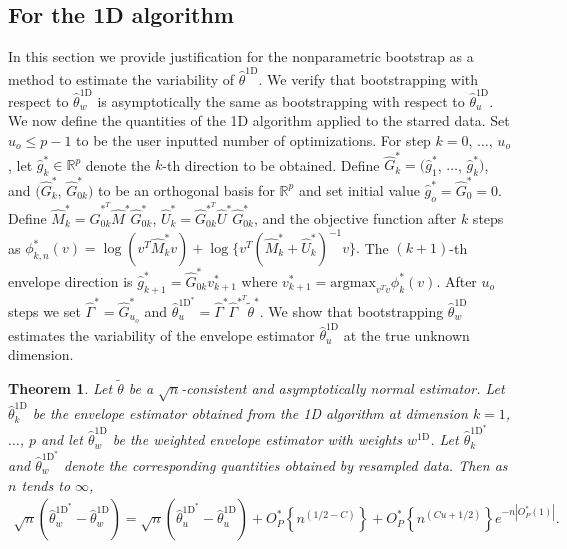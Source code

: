 \documentclass{article}\usepackage[]{graphicx}\usepackage[]{color}
\newcommand{\R}{\mathbb{R}}
\newcommand{\Mstar}{\widehat{M}^{\textstyle{*}}}
\newcommand{\Ustar}{\widehat{U}^{\textstyle{*}}}
\newcommand{\TFG}{\widehat{\theta}^{\text{FG}}}
\newcommand{\TD}{\widehat{\theta}^{\text{1D}}}
\newcommand{\Ttil}{\widetilde{\theta}}
\newcommand{\TstarFG}{\widehat{\theta}^{{\text{FG}}^{\textstyle{*}}}}
\newcommand{\TstarD}{\widehat{\theta}^{{\text{1D}}^{\textstyle{*}}}}
\newcommand{\Ttilstar}{\widetilde{\theta}^{\textstyle{*}}}
\newcommand{\Gamstar}{\widehat{\Gamma}^{\textstyle{*}}}
\newcommand{\GamstarT}{\widehat{\Gamma}^{\textstyle{*}^T}}
\newcommand{\rootn}{\sqrt{n}}
\newcommand{\phistar}{\phi^{\textstyle{*}}}
\newcommand{\woneD}{w^{\text{1D}}}
\newcommand{\gstar}{\hat{g}^{\textstyle{*}}}
\newcommand{\Gstar}{\widehat{G}^{\textstyle{*}}}
\newcommand{\GstarT}{\widehat{G}^{\textstyle{*}^T}}
\newcommand{\vstar}{v^{\textstyle{*}}}
\newtheorem{thm}{Theorem}
\begin{document}
\subsection{For the 1D algorithm}
\label{sec:boot1D}

In this section we provide justification for the nonparametric bootstrap as a method to estimate the variability of $\TD$. %
We verify that bootstrapping with respect to $\TD_w$ is asymptotically the same as bootstrapping with respect to $\TD_u$. We now define the quantities of the 1D algorithm applied to the starred data. Set $u_o \leq p-1$ to be the user inputted number of optimizations. For step $k = 0$, $\ldots$, $u_o$, let $\gstar_k \in \R^p$ denote the $k$-th direction to be obtained. Define $\Gstar_k = (\gstar_1$, $\ldots$, $\gstar_k)$, and $(\Gstar_k$, $\Gstar_{0k})$ to be an orthogonal basis for $\R^p$ and set initial value $\gstar_o = \Gstar_{0} = 0$. Define $\Mstar_k = \GstarT_{0k}\Mstar\Gstar_{0k}$, $\Ustar_k = \GstarT_{0k}\Ustar\Gstar_{0k}$, and the objective function after $k$ steps as
$
  \phistar_{k,n}(v) = \log(v^T \Mstar_k v) 
    + \log\{v^T(\Mstar_k + \Ustar_k)^{-1} v\}.
$
The $(k+1)$-th envelope direction is $\gstar_{k+1} = \Gstar_{0k}\vstar_{k+1}$ where $\vstar_{k+1} = \text{argmax}_{v^Tv}\phistar_k(v)$. After $u_o$ steps we set $\Gamstar = \Gstar_{u_o}$ and  $\TstarD_u = \Gamstar\GamstarT\Ttilstar$. We show that bootstrapping $\TD_w$ estimates the variability of the envelope estimator $\TD_u$ at the true unknown dimension. 



\begin{thm}
Let $\Ttil$ be a $\rootn$-consistent and asymptotically normal estimator. Let $\TD_k$ be the envelope estimator obtained from the 1D algorithm at dimension $k = 1$, $\ldots$, $p$ and let $\TD_w$ be the weighted envelope estimator with weights $\woneD$. Let $\TstarD_k$ and $\TstarD_w$ denote the corresponding quantities obtained by resampled data. Then as $n$ tends to $\infty$,
\begin{equation}
\begin{split}
  \rootn\left(\TstarD_w - \TD_w\right) 
    = \rootn\left(\TstarD_u - \TD_u\right) 
    + O_P^{\textstyle{*}}\left\{n^{\left(1/2 - C\right)}\right\}
    + O_P^{\textstyle{*}}\left\{n^{(Cu + 1/2)}\right\}
      e^{-n|O_P^{\textstyle{*}}(1)|}.
\end{split}
\label{TDterms}
\end{equation} 
\label{thm:TD}
\end{thm}
\end{document}
